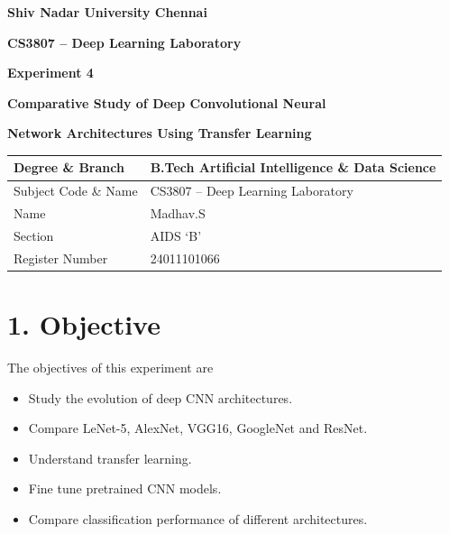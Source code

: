 \documentclass[11pt]{article}
\begin{document}

\begin{center}

{\Large\textbf{Shiv Nadar University Chennai}}

\vspace{3mm}

{\large\textbf{CS3807 -- Deep Learning Laboratory}}

\vspace{3mm}

{\Large\textbf{Experiment 4}}

\vspace{2mm}

{\Large\textbf{Comparative Study of Deep Convolutional Neural}}

{\Large\textbf{Network Architectures Using Transfer Learning}}

\end{center}

\vspace{5mm}

\begin{tabular}{|p{4cm}|p{10cm}|}
\hline
Degree \& Branch &
B.Tech Artificial Intelligence \& Data Science\\
\hline
Subject Code \& Name &
CS3807 -- Deep Learning Laboratory\\
\hline
Name & Madhav.S\\
\hline
Section & AIDS `B'\\
\hline
Register Number & 24011101066\\
\hline
\end{tabular}


\section*{1. Objective}

The objectives of this experiment are

\begin{itemize}

\item Study the evolution of deep CNN architectures.

\item Compare LeNet-5, AlexNet, VGG16, GoogleNet and ResNet.

\item Understand transfer learning.

\item Fine tune pretrained CNN models.

\item Compare classification performance of different architectures.

\end{itemize}
\end{document}
